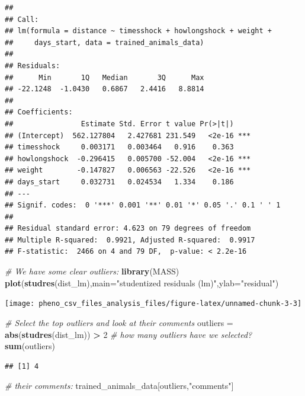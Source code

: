 \documentclass[]{article}
\newenvironment{Shaded}{\begin{snugshade}}{\end{snugshade}}
\newcommand{\KeywordTok}[1]{\textcolor[rgb]{0.13,0.29,0.53}{\textbf{#1}}}
\newcommand{\DataTypeTok}[1]{\textcolor[rgb]{0.13,0.29,0.53}{#1}}
\newcommand{\DecValTok}[1]{\textcolor[rgb]{0.00,0.00,0.81}{#1}}
\newcommand{\StringTok}[1]{\textcolor[rgb]{0.31,0.60,0.02}{#1}}
\newcommand{\CommentTok}[1]{\textcolor[rgb]{0.56,0.35,0.01}{\textit{#1}}}
\newcommand{\OperatorTok}[1]{\textcolor[rgb]{0.81,0.36,0.00}{\textbf{#1}}}
\newcommand{\NormalTok}[1]{#1}
\begin{document}
\begin{verbatim}
## 
## Call:
## lm(formula = distance ~ timesshock + howlongshock + weight + 
##     days_start, data = trained_animals_data)
## 
## Residuals:
##      Min       1Q   Median       3Q      Max 
## -22.1248  -1.0430   0.6867   2.4416   8.8814 
## 
## Coefficients:
##                Estimate Std. Error t value Pr(>|t|)    
## (Intercept)  562.127804   2.427681 231.549   <2e-16 ***
## timesshock     0.003171   0.003464   0.916    0.363    
## howlongshock  -0.296415   0.005700 -52.004   <2e-16 ***
## weight        -0.147827   0.006563 -22.526   <2e-16 ***
## days_start     0.032731   0.024534   1.334    0.186    
## ---
## Signif. codes:  0 '***' 0.001 '**' 0.01 '*' 0.05 '.' 0.1 ' ' 1
## 
## Residual standard error: 4.623 on 79 degrees of freedom
## Multiple R-squared:  0.9921, Adjusted R-squared:  0.9917 
## F-statistic:  2466 on 4 and 79 DF,  p-value: < 2.2e-16
\end{verbatim}

\begin{Shaded}
\begin{Highlighting}[]
\CommentTok{# We have some clear outliers:}
\KeywordTok{library}\NormalTok{(MASS)}
\KeywordTok{plot}\NormalTok{(}\KeywordTok{studres}\NormalTok{(dist_lm),}\DataTypeTok{main=}\StringTok{"studentized residuals (lm)"}\NormalTok{,}\DataTypeTok{ylab=}\StringTok{"residual"}\NormalTok{)}
\end{Highlighting}
\end{Shaded}

\texttt{[image: pheno\_csv\_files\_analysis\_files/figure-latex/unnamed-chunk-3-3]}

\begin{Shaded}
\begin{Highlighting}[]
\CommentTok{# Select the top outliers and look at their comments}
\NormalTok{outliers =}\StringTok{ }\KeywordTok{abs}\NormalTok{(}\KeywordTok{studres}\NormalTok{(dist_lm)) }\OperatorTok{>}\StringTok{ }\DecValTok{2}
\CommentTok{# how many outliers have we selected?}
\KeywordTok{sum}\NormalTok{(outliers)}
\end{Highlighting}
\end{Shaded}

\begin{verbatim}
## [1] 4
\end{verbatim}

\begin{Shaded}
\begin{Highlighting}[]
\CommentTok{# their comments:}
\NormalTok{trained_animals_data[outliers,}\StringTok{"comments"}\NormalTok{]}
\end{Highlighting}
\end{Shaded}
\end{document}
